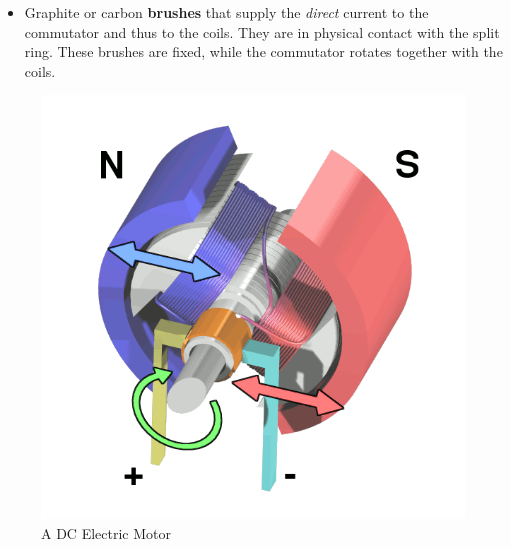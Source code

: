 \begin{itemize}
	\item Graphite or carbon \textbf{brushes} that supply the \emph{direct} current to the commutator and thus to the coils. They are in physical contact with the split ring. These brushes are fixed, while the commutator rotates together with the coils.

\end{itemize} 

\begin{figure}[h!]
	\centering
	\includegraphics[scale=0.5]{img/motor.png}
	\caption{A DC Electric Motor}
\end{figure}

\pagebreak


